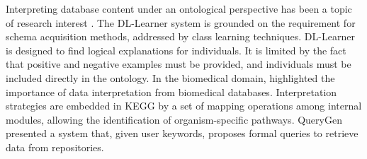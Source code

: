 Interpreting database content under an ontological perspective has been a topic of research interest \citep{Lehmann2009,Kanehisa2012,Carnielli2015}. 
The DL-Learner system \cite{Lehmann2009} is grounded on the requirement for schema acquisition methods, addressed by class learning techniques. DL-Learner is designed to find logical explanations for individuals. It is limited by the fact that positive and negative examples must be provided, and individuals must be included directly in the ontology.
In the biomedical domain, \cite{Kanehisa2012} highlighted the importance of data interpretation from biomedical databases. Interpretation strategies are embedded in KEGG by a set of mapping operations among internal modules, allowing the identification of organism-specific pathways. QueryGen \citep{Bobed2016} presented a system that, given user keywords, proposes formal queries to retrieve data from repositories. 



